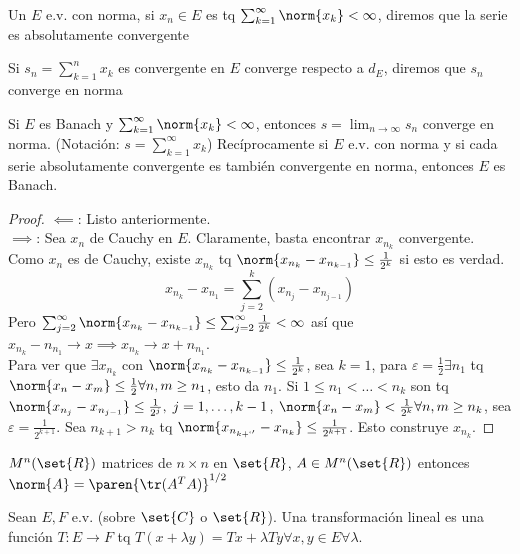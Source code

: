\documentclass{notetaking}
\begin{document}
\begin{defn}
    Un \(E\) e.v. con norma, si \(x_n\in E\) es tq \(\sum_{k=1}^\infty\norm{x_k}<\infty\), diremos que la serie es absolutamente convergente
\end{defn}
\begin{defn}
    Si \(s_n=\sum_{k=1}^nx_k\) es convergente en \(E\) converge respecto a \(d_E\), diremos que \(s_n\) converge en norma
\end{defn}
\begin{prp}
    Si \(E\) es Banach y \(\sum_{k=1}^\infty\norm{x_k}<\infty\), entonces \(s=\lim_{n\rightarrow\infty}s_n\) converge en norma. (Notación: \(s=\sum_{k=1}^\infty x_k\)) Recíprocamente si \(E\) e.v. con norma y si cada serie absolutamente convergente es también convergente en norma, entonces \(E\) es Banach.
\end{prp}
\begin{proof}
    \(\impliedby\): Listo anteriormente.\\
    \(\implies\): Sea \(x_n\) de Cauchy en \(E\). Claramente, basta encontrar \(x_{n_k}\) convergente.\\
    Como \(x_n\) es de Cauchy, existe \(x_{n_k}\) tq \(\norm{x_{n_k}-x_{n_{k-1}}}\leq\frac1{2^k}\) si esto es verdad.
    \[
        x_{n_k}-x_{n_1}=\sum_{j=2}^k(x_{n_j}-x_{n_{j-1}})
    \]
    Pero \(\sum_{j=2}^\infty\norm{x_{n_k}-x_{n_{k-1}}}\leq\sum_{j=2}^\infty\frac1{2^k}<\infty\) así que \(x_{n_k}-n_{n_1}\rightarrow x\implies x_{n_k}\rightarrow x+n_{n_1}\).\\
    Para ver que \(\exists x_{n_k}\) con \(\norm{x_{n_k}-x_{n_{k-1}}}\leq\frac1{2^k}\), sea \(k=1\), para \(\varepsilon=\frac12\exists n_1\) tq \(\norm{x_n-x_m}\leq\frac12\forall n,m\geq n_1\), esto da \(n_1\). Si \(1\leq n_1<\dots<n_k\) son tq \(\norm{x_{n_j}-x_{n_{j-1}}}\leq\frac1{2^j},\; j=1,\dots,k-1\), \(\norm{x_n-x_m}<\frac1{2^k}\forall n,m\geq n_k\), sea \(\varepsilon=\frac1{2^{k+1}}\). Sea \(n_{k+1}>n_k\) tq \(\norm{x_{n_{k+`'}}-x_{n_{k}}}\leq\frac1{2^{k+1}}\). Esto construye \(x_{n_k}\).
\end{proof}
\begin{ejm}
    \(M^n(\set{R})\) matrices de \(n\times n\) en \(\set{R}\), \(A\in M^n(\set{R})\) entonces \(\norm{A}=\paren{\tr(A^TA)}^{1/2}\)
\end{ejm}

\begin{defn}
    Sean \(E,F\) e.v. (sobre \(\set{C}\) o \(\set{R}\)). Una transformación lineal es una función \(T:E\rightarrow F\) tq \(T(x+\lambda y)=Tx+\lambda Ty\forall x,y\in E\forall\lambda\).
\end{defn}
\end{document}
